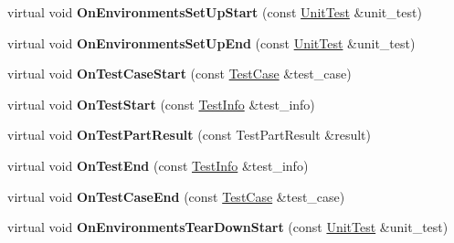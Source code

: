 \begin{DoxyCompactItemize}
virtual void {\bfseries On\+Environments\+Set\+Up\+Start} (const \mbox{\hyperlink{classtesting_1_1_unit_test}{Unit\+Test}} \&unit\+\_\+test)
\item 
\mbox{\label{classtesting_1_1internal_1_1_test_event_repeater_a3a92696df942dc92f985e52fddd6d303}} 
virtual void {\bfseries On\+Environments\+Set\+Up\+End} (const \mbox{\hyperlink{classtesting_1_1_unit_test}{Unit\+Test}} \&unit\+\_\+test)
\item 
\mbox{\label{classtesting_1_1internal_1_1_test_event_repeater_a70124c738caa338bcd723eb2a51c8b3e}} 
virtual void {\bfseries On\+Test\+Case\+Start} (const \mbox{\hyperlink{classtesting_1_1_test_case}{Test\+Case}} \&test\+\_\+case)
\item 
\mbox{\label{classtesting_1_1internal_1_1_test_event_repeater_a70d694ca5010cc86cd458f7f529e6fbe}} 
virtual void {\bfseries On\+Test\+Start} (const \mbox{\hyperlink{classtesting_1_1_test_info}{Test\+Info}} \&test\+\_\+info)
\item 
\mbox{\label{classtesting_1_1internal_1_1_test_event_repeater_ac8fb21da6802b1ebab9cad3eee9150eb}} 
virtual void {\bfseries On\+Test\+Part\+Result} (const Test\+Part\+Result \&result)
\item 
\mbox{\label{classtesting_1_1internal_1_1_test_event_repeater_aa0f13bded9369aae1c78583d7276f8b1}} 
virtual void {\bfseries On\+Test\+End} (const \mbox{\hyperlink{classtesting_1_1_test_info}{Test\+Info}} \&test\+\_\+info)
\item 
\mbox{\label{classtesting_1_1internal_1_1_test_event_repeater_a0a335e1c3957a8c699ed56e37ea7b978}} 
virtual void {\bfseries On\+Test\+Case\+End} (const \mbox{\hyperlink{classtesting_1_1_test_case}{Test\+Case}} \&test\+\_\+case)
\item 
\mbox{\label{classtesting_1_1internal_1_1_test_event_repeater_a30db75df2d9a65d787f31e16004613c2}} 
virtual void {\bfseries On\+Environments\+Tear\+Down\+Start} (const \mbox{\hyperlink{classtesting_1_1_unit_test}{Unit\+Test}} \&unit\+\_\+test)

\end{DoxyCompactItemize}

